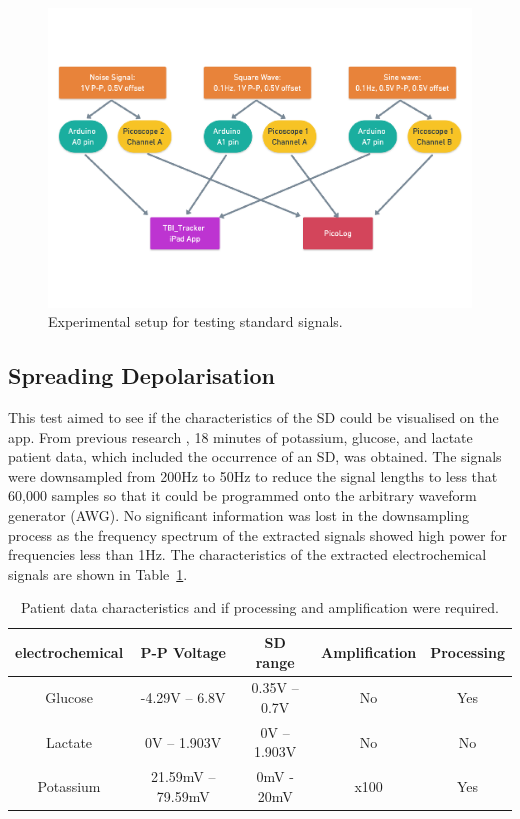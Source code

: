 \begin{figure}[h!]
\centering
\includegraphics[trim={0cm 3cm 0cm  3cm}, clip, width=.9\textwidth]{./figures/test1.pdf}
\captionsetup{justification=centering}
\caption{Experimental setup for testing standard signals.}
\label{fig: test1}
\end{figure}


\subsection{Spreading Depolarisation}
This test aimed to see if the characteristics of the SD could be visualised on the app. From previous research \cite{Rogers2017}, 18 minutes of potassium, glucose, and lactate patient data, which included the occurrence of an SD, was obtained. The signals were downsampled from 200Hz to 50Hz to reduce the signal lengths to less that 60,000 samples so that it could be programmed onto the arbitrary waveform generator (AWG). No significant information was lost in the downsampling process as the frequency spectrum of the extracted signals showed high power for frequencies less than 1Hz. The characteristics of the extracted electrochemical signals are shown in Table~\ref{table: patient data}. 


\begin{table}[h!]
\centering
\begin{tabular}{||c c c c c||} 
 \hline
 electrochemical & P-P Voltage & SD range & Amplification & Processing\\ [0.5ex] 
 \hline\hline
 Glucose & -4.29V -- 6.8V & 0.35V -- 0.7V & No & Yes \\
 Lactate & 0V -- 1.903V & 0V -- 1.903V & No & No \\
 Potassium & 21.59mV -- 79.59mV & 0mV - 20mV & x100 & Yes \\
 \hline
\end{tabular}
\caption{Patient data characteristics and if processing and amplification were required.}
\label{table: patient data}
\end{table}

